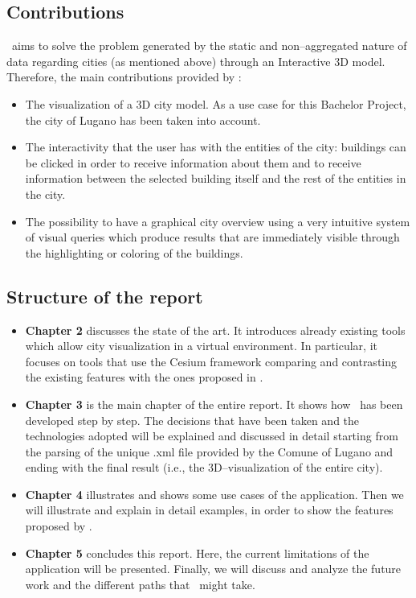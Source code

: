 \subsection{Contributions}
\applicationName\ aims to solve the problem generated by the static and non--aggregated nature of data regarding cities (as mentioned above) through an Interactive 3D model. Therefore, the main contributions provided by \applicationName:
\begin{itemize}
	\item The visualization of a 3D city model. As a use case for this Bachelor Project, the city of Lugano has been taken into account.
	\item The interactivity that the user has with the entities of the city: buildings can be clicked in order to receive information about them and  to receive information between the selected building itself and the rest of the entities in the city.
	\item The possibility to have a graphical city overview using a very intuitive system of visual queries which produce results that are immediately visible through the highlighting or coloring of the buildings. 
\end{itemize} 
\subsection{Structure of the report}
\begin{itemize}
	\item {\bf Chapter 2} discusses the state of the art. It introduces already existing tools which allow city visualization in a virtual environment. In particular, it focuses on tools that use the Cesium framework comparing and contrasting the existing features with the ones proposed in \applicationName.
	\item {\bf Chapter 3} is the main chapter of the entire report. It shows how \applicationName\ has been developed step by step. The decisions that have been taken and the technologies adopted will be explained and discussed in detail starting from the parsing of the unique .xml file provided by the Comune of Lugano and ending with the final result (i.e., the 3D--visualization of the entire city). 
	\item {\bf Chapter 4} illustrates and shows some use cases of the application. Then we will illustrate and explain in detail examples, in order to show the features proposed by \applicationName. 
	\item {\bf Chapter 5} concludes this report. Here, the current limitations of the application will be presented. Finally, we will discuss and analyze the future work and the different paths that \applicationName\ might take.
\end{itemize}